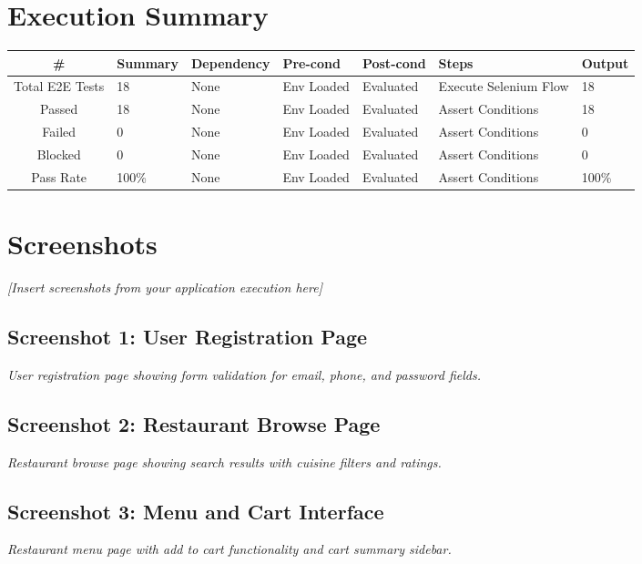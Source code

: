 \documentclass[12pt,a4paper]{report}
\begin{document}
\section{Execution Summary}

\begin{longtable}{|c|p{1.8cm}|p{1.4cm}|p{1.8cm}|p{1.8cm}|p{2.2cm}|p{1.6cm}|}
\hline
\textbf{\#} & \textbf{Summary} & \textbf{Dependency} & \textbf{Pre-cond} & \textbf{Post-cond} & \textbf{Steps} & \textbf{Output} \\
\hline
\endfirsthead
Total E2E Tests & 18 & None & Env Loaded & Evaluated & Execute Selenium Flow & 18 \\
\hline
Passed & 18 & None & Env Loaded & Evaluated & Assert Conditions & 18 \\
\hline
Failed & 0 & None & Env Loaded & Evaluated & Assert Conditions & 0 \\
\hline
Blocked & 0 & None & Env Loaded & Evaluated & Assert Conditions & 0 \\
\hline
Pass Rate & 100\% & None & Env Loaded & Evaluated & Assert Conditions & 100\% \\
\hline
\end{longtable}

\section{Screenshots}

\textit{[Insert screenshots from your application execution here]}

\subsection*{Screenshot 1: User Registration Page}
\textit{User registration page showing form validation for email, phone, and password fields.}

\subsection*{Screenshot 2: Restaurant Browse Page}
\textit{Restaurant browse page showing search results with cuisine filters and ratings.}

\subsection*{Screenshot 3: Menu and Cart Interface}
\textit{Restaurant menu page with add to cart functionality and cart summary sidebar.}
\end{document}
